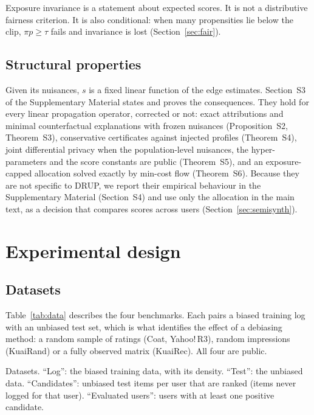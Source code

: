 \documentclass[preprint,review,12pt,authoryear]{elsarticle}
\theoremstyle{definition}
\begin{document}
Exposure invariance is a statement about expected scores. It is not a
distributive fairness criterion. It is also conditional: when many propensities
lie below the clip, $\pi p\ge\tau$ fails and invariance is lost
(Section~\ref{sec:fair}).

\subsection{Structural properties}\label{sec:structsum}

Given its nuisances, $s$ is a fixed linear function of the edge estimates.
Section~S3 of the Supplementary Material states and proves the
consequences. They hold for every linear propagation operator, corrected or
not: exact attributions and minimal counterfactual explanations with frozen
nuisances (Proposition~S2, Theorem~S3), conservative
certificates against injected profiles (Theorem~S4), joint
differential privacy when the population-level nuisances, the
hyper-parameters and the score constants are public (Theorem~S5),
and an exposure-capped allocation solved exactly by min-cost flow
(Theorem~S6). Because they are not specific to DRUP, we report
their empirical behaviour in the Supplementary Material
(Section~S4) and use only the allocation in the main text, as a
decision that compares scores across users (Section~\ref{sec:semisynth}).

\section{Experimental design}\label{sec:setup}

\subsection{Datasets}\label{sec:data}

Table~\ref{tab:data} describes the four benchmarks. Each pairs a biased
training log with an unbiased test set, which is what identifies the effect of a
debiasing method: a random sample of ratings (Coat, Yahoo!\,R3), random
impressions (KuaiRand) or a fully observed matrix (KuaiRec). All four are public.

\begin{table}[t]\centering\scriptsize
\caption{Datasets. ``Log'': the biased training data, with its density.
``Test'': the unbiased data. ``Candidates'': unbiased test items per user that are
ranked (items never logged for that user). ``Evaluated users'': users with at
least one positive candidate.}\label{tab:data}
\begin{adjustbox}{max width=\textwidth}

\end{adjustbox}
\end{table}
\end{document}
